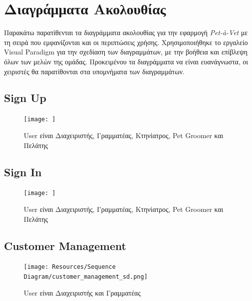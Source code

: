 \documentclass[12pt,a4paper,twoside]{book}
\begin{document}
\section{Διαγράμματα Ακολουθίας}

Παρακάτω παρατίθενται τα διαγράμματα ακολουθίας για την εφαρμογή \textit{Pet-à-Vet} με τη σειρά που εμφανίζονται και οι περιπτώσεις χρήσης. Χρησιμοποιήθηκε το εργαλείο Visual Paradigm για την σχεδίαση των διαγραμμάτων, με την βοήθεια και επίβλεψη όλων των μελών της ομάδας. Προκειμένου τα διαγράμματα να είναι ευανάγνωστα, οι χειριστές θα παρατίθονται στα υπομνήματα των διαγραμμάτων. %

\subsection{Sign Up}
\begin{figure}[H]
    \centering
    \texttt{[image: ]}
    \caption{User είναι Διαχειριστής, Γραμματέας, Κτηνίατρος, Pet Groomer και Πελάτης}\label{fig:sequence-signup}
\end{figure}

\subsection{Sign In}
\begin{figure}[H]
    \centering
    \texttt{[image: ]}
    \caption{User είναι Διαχειριστής, Γραμματέας, Κτηνίατρος, Pet Groomer και Πελάτης}\label{fig:sequence-signin}
\end{figure}

\subsection{Customer Management}
\begin{figure}[H]
    \centering
    \texttt{[image: Resources/Sequence Diagram/customer\_management\_sd.png]}
    \caption{User είναι Διαχειριστής και Γραμματέας}\label{fig:sequence-customer-management}
\end{figure}
\end{document}
